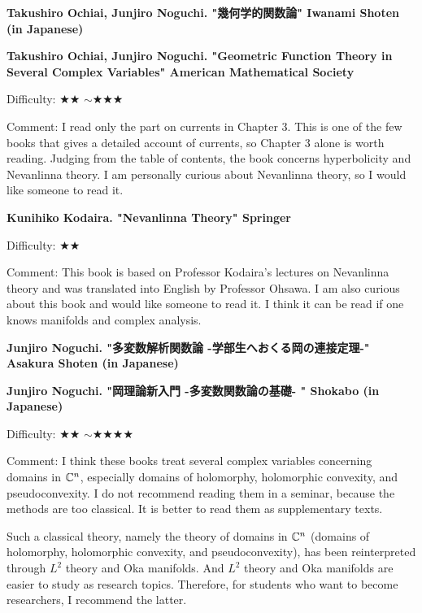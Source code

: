 \textbf{Takushiro Ochiai, Junjiro Noguchi. "幾何学的関数論" Iwanami Shoten  (in Japanese)}  　\vspace{-6pt} 

\textbf{Takushiro Ochiai, Junjiro Noguchi. "Geometric Function Theory in Several Complex Variables" American Mathematical Society}  　\vspace{-6pt} 

Difficulty: ★★ $\sim$★★★ 　\vspace{-6pt} 

Comment: I read only the part on currents in Chapter 3. This is one of the few books that gives a detailed account of currents, so Chapter 3 alone is worth reading. Judging from the table of contents, the book concerns hyperbolicity and Nevanlinna theory. I am personally curious about Nevanlinna theory, so I would like someone to read it.
\vspace{8pt}

\textbf{Kunihiko Kodaira. "Nevanlinna Theory" Springer}  　\vspace{-6pt} 

Difficulty: ★★ 　\vspace{-6pt} 

Comment: This book is based on Professor Kodaira's lectures on Nevanlinna theory and was translated into English by Professor Ohsawa. I am also curious about this book and would like someone to read it. I think it can be read if one knows manifolds and complex analysis.
\vspace{8pt}

\textbf{Junjiro Noguchi. "多変数解析関数論 -学部生へおくる岡の連接定理-" Asakura Shoten (in Japanese)}  　\vspace{-6pt} 

\textbf{Junjiro Noguchi. "岡理論新入門 -多変数関数論の基礎- "  Shokabo (in Japanese)}  　\vspace{-6pt} 

Difficulty: ★★ $\sim$★★★★ 　\vspace{-6pt} 

Comment: I think these books treat several complex variables concerning domains in $\mathbb{C}^n$, especially domains of holomorphy, holomorphic convexity, and pseudoconvexity. I do not recommend reading them in a seminar, because the methods are too classical. It is better to read them as supplementary texts.

Such a classical theory, namely the theory of domains in $\mathbb{C}^n$ (domains of holomorphy, holomorphic convexity, and pseudoconvexity), has been reinterpreted through $L^2$ theory and Oka manifolds. And $L^2$ theory and Oka manifolds are easier to study as research topics. Therefore, for students who want to become researchers, I  recommend the latter.

